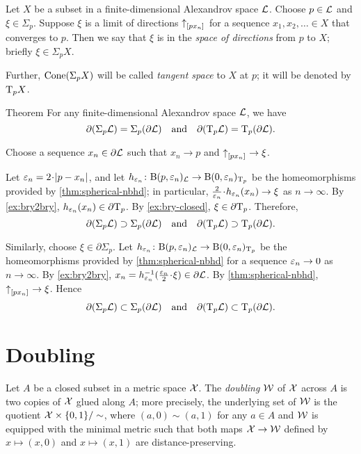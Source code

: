 Let $X$ be a subset in a finite-dimensional Alexandrov space $\mathcal{L}$.
Choose $p\in \mathcal{L}$ and $\xi\in \Sigma_p$.
Suppose $\xi$ is a limit of directions ${\uparrow}_{[{p}{x_n}]_{{}}}$ for a sequence $x_1,x_2,\dots{}\in X$ that converges to $p$.
Then we say that $\xi$ is in the \emph{space of directions} from $p$ to $X$;
briefly $\xi\in\Sigma_pX$.

Further, $\mathop{\rm Cone}\nolimits(\Sigma_pX)$ will be called \emph{tangent space} to $X$ at $p$;
it will be denoted by $\mathrm{T}_pX$.

\begin{thm}{Theorem}\label{thm:partial-Sigma}
For any finite-dimensional Alexandrov space $\mathcal{L}$, we have
\[\partial (\Sigma_p\mathcal{L})=\Sigma_p(\partial\mathcal{L})
\quad\text{and}\quad
\partial(\mathrm{T}_p\mathcal{L})=\mathrm{T}_p(\partial\mathcal{L}).\]
\end{thm}

Choose a sequence $x_n\in \partial \mathcal{L}$ such that $x_n\to p$ and ${\uparrow}_{[{p}{x_n}]_{{}}}\to\xi$.

Let $\eps_n=2\cdot \dist{p}{x_n}{}$,
and let $h_{\varepsilon_n}\colon\mathrm{B}{}(p,\varepsilon_n)_{\mathcal{L}}\to \mathrm{B}{}(0,\varepsilon_n)_{\mathrm{T}_p}$ be the homeomorphisms provided by \ref{thm:spherical-nbhd};
in particular, $\tfrac2{\eps_n}\cdot h_{\eps_n}(x_n)\to \xi$ as $n\to\infty$.
By \ref{ex:bry2bry}, $h_{\varepsilon_n}(x_n)\in \partial \mathrm{T}_p$.
By \ref{ex:bry-closed}, $\xi\in \partial \mathrm{T}_p$.
Therefore,
\[\partial (\Sigma_p\mathcal{L})\supset\Sigma_p(\partial\mathcal{L})
\quad\text{and}\quad
\partial(\mathrm{T}_p\mathcal{L})\supset\mathrm{T}_p(\partial\mathcal{L}).\]

Similarly, choose $\xi\in\partial\Sigma_p$.
Let $h_{\varepsilon_n}\colon\mathrm{B}{}(p,\varepsilon_n)_{\mathcal{L}}\to \mathrm{B}{}(0,\varepsilon_n)_{\mathrm{T}_p}$ be the homeomorphisms provided by \ref{thm:spherical-nbhd} for a sequence $\varepsilon_n\to 0$ as $n\to\infty$.
By \ref{ex:bry2bry}, $x_n=h_{\eps_n}^{-1}(\tfrac{\eps_n}2\cdot\xi)\in \partial \spc{L}$.
By \ref{thm:spherical-nbhd}, ${\uparrow}_{[{p}{x_n}]_{{}}}\to \xi$.
Hence
\[\partial (\Sigma_p\mathcal{L})\subset\Sigma_p(\partial\mathcal{L})
\quad\text{and}\quad\partial(\mathrm{T}_p\mathcal{L})\subset\mathrm{T}_p(\partial\mathcal{L}).\]
\qedsf

\section{Doubling}

Let $A$ be a closed subset in a metric space $\mathcal{X}$.
The \emph{doubling} $\mathcal{W}$ of $\mathcal{X}$ across $A$ is two copies of $\mathcal{X}$ glued along $A$;
more precisely, the underlying set of $\mathcal{W}$ is the quotient $\mathcal{X}\times\{0,1\}/\sim$, where $(a,0)\sim (a,1)$ for any $a\in A$ and $\mathcal{W}$ is equipped with the minimal metric such that both maps $\mathcal{X}\to \mathcal{W}$ defined by $x\mapsto (x,0)$ and $x\mapsto (x,1)$ are distance-preserving.

